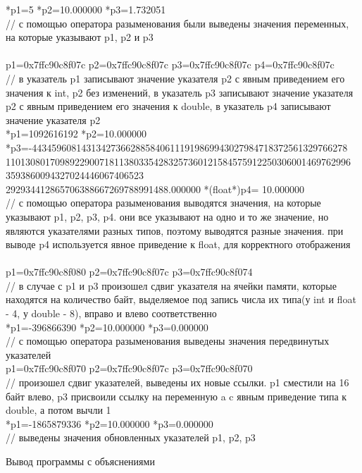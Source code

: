 \documentclass[a4paper,14pt]{extarticle}
\begin{document}
\begin{footnotesize}
*p1=5	*p2=10.000000	*p3=1.732051\\
// с помощью оператора разыменования были выведены значения переменных, на которые указывают p1, p2 и p3\\
\\
p1=0x7ffc90c8f07c	p2=0x7ffc90c8f07c	p3=0x7ffc90c8f07c	p4=0x7ffc90c8f07c\\
// в указатель p1 записывают значение указателя p2 с явным приведением его значения к int, p2 без изменений, в указатель p3 записывают значение указателя p2 с явным приведением его значения к double, в указатель p4 записывают значение указателя p2\\
*p1=1092616192	*p2=10.000000	*p3=-4434596081431342736628858406111919869943027984718372561329766278\\1101308017098922900718113803354283257360121584575912250306001469762996
3593860094327024446067406523\\292934412865706388667269788991488.000000	*(float*)p4=  10.000000\\
// с помощью оператора разыменования выводятся значения, на которые указывают p1, p2, p3, p4. они все указывают на одно и то же значение, но являются указателями разных типов, поэтому выводятся разные значения. при выводе p4 используется явное приведение к float, для корректного отображения\\
\\
p1=0x7ffc90c8f080	p2=0x7ffc90c8f07c	p3=0x7ffc90c8f074\\
// в случае с p1 и p3 произошел сдвиг указателя на ячейки памяти, которые находятся на количество байт, выделяемое под запись числа их типа(у int и float - 4, у double - 8), вправо и влево соответственно\\
*p1=-396866390		*p2=10.000000	*p3=0.000000\\
// с помощью оператора разыменования выведены значения передвинутых указателей\\
p1=0x7ffc90c8f070	p2=0x7ffc90c8f07c	p3=0x7ffc90c8f070\\
// произошел сдвиг указателей, выведены их новые ссылки. p1 сместили на 16 байт влево, p3 присвоили ссылку на переменную a c явным приведение типа к double, а потом вычли 1\\
*p1=-1865879336	*p2=10.000000	*p3=0.000000\\
// выведены значения обновленных указателей p1, p2, p3\\
\end{footnotesize}
\begin{center}
{\small Вывод программы с объяснениями}
\end{center}
\end{document}

